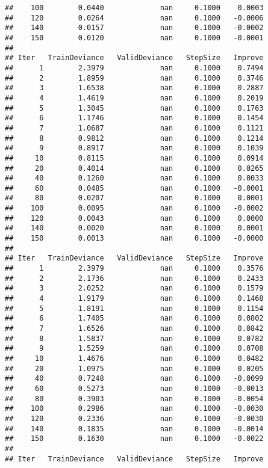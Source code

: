\documentclass[]{article}
\begin{document}
\begin{verbatim}
##    100        0.0440             nan     0.1000    0.0003
##    120        0.0264             nan     0.1000   -0.0006
##    140        0.0157             nan     0.1000   -0.0002
##    150        0.0120             nan     0.1000   -0.0001
## 
## Iter   TrainDeviance   ValidDeviance   StepSize   Improve
##      1        2.3979             nan     0.1000    0.7494
##      2        1.8959             nan     0.1000    0.3746
##      3        1.6538             nan     0.1000    0.2887
##      4        1.4619             nan     0.1000    0.2019
##      5        1.3045             nan     0.1000    0.1763
##      6        1.1746             nan     0.1000    0.1454
##      7        1.0687             nan     0.1000    0.1121
##      8        0.9812             nan     0.1000    0.1214
##      9        0.8917             nan     0.1000    0.1039
##     10        0.8115             nan     0.1000    0.0914
##     20        0.4014             nan     0.1000    0.0265
##     40        0.1260             nan     0.1000    0.0033
##     60        0.0485             nan     0.1000   -0.0001
##     80        0.0207             nan     0.1000    0.0001
##    100        0.0095             nan     0.1000   -0.0002
##    120        0.0043             nan     0.1000    0.0000
##    140        0.0020             nan     0.1000    0.0001
##    150        0.0013             nan     0.1000   -0.0000
## 
## Iter   TrainDeviance   ValidDeviance   StepSize   Improve
##      1        2.3979             nan     0.1000    0.3576
##      2        2.1736             nan     0.1000    0.2433
##      3        2.0252             nan     0.1000    0.1579
##      4        1.9179             nan     0.1000    0.1468
##      5        1.8191             nan     0.1000    0.1154
##      6        1.7405             nan     0.1000    0.0802
##      7        1.6526             nan     0.1000    0.0842
##      8        1.5837             nan     0.1000    0.0782
##      9        1.5259             nan     0.1000    0.0708
##     10        1.4676             nan     0.1000    0.0482
##     20        1.0975             nan     0.1000    0.0205
##     40        0.7248             nan     0.1000   -0.0099
##     60        0.5273             nan     0.1000   -0.0013
##     80        0.3903             nan     0.1000   -0.0054
##    100        0.2986             nan     0.1000   -0.0030
##    120        0.2336             nan     0.1000   -0.0030
##    140        0.1835             nan     0.1000   -0.0014
##    150        0.1630             nan     0.1000   -0.0022
## 
## Iter   TrainDeviance   ValidDeviance   StepSize   Improve

\end{verbatim}
\end{document}

